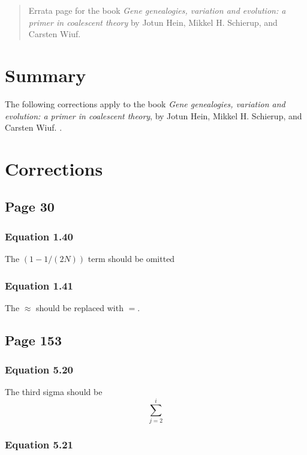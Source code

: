 

\newcommand{\mathstop}{\text{\ .}}



\begin{abstract}
Errata page for the book
\emph{Gene genealogies, variation and evolution: a primer in coalescent theory}
by Jotun Hein, Mikkel H. Schierup, and Carsten Wiuf.
\end{abstract}


\section{Summary}

The following corrections apply to the book
\emph{Gene genealogies, variation and evolution: a primer in coalescent theory},
by Jotun Hein, Mikkel H. Schierup, and Carsten Wiuf.
\cite{hein_gene_2006}.


\section{Corrections}

\subsection{Page 30}

\subsubsection{Equation 1.40}

The $(1 - 1/(2 N))$ term should be omitted

\subsubsection{Equation 1.41}

The $\approx$ should be replaced with $=$.

\subsection{Page 153}

\subsubsection{Equation 5.20}

The third sigma should be
\[
\sum_{j=2}^i
\]

\subsubsection{Equation 5.21}

